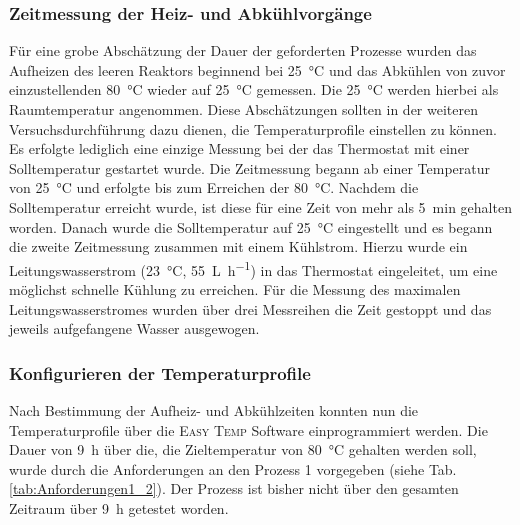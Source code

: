\subsubsection*{Zeitmessung der Heiz- und Abkühlvorgänge}
Für eine grobe Abschätzung der Dauer der geforderten Prozesse wurden das Aufheizen des leeren Reaktors beginnend bei \SI{25}{\celsius} und das Abkühlen von zuvor einzustellenden \SI{80}{\celsius} wieder auf \SI{25}{\celsius} gemessen. Die \SI{25}{\celsius} werden hierbei als Raumtemperatur angenommen. Diese Abschätzungen sollten in der weiteren Versuchsdurchführung dazu dienen, die Temperaturprofile einstellen zu können.\\
Es erfolgte lediglich eine einzige Messung bei der das Thermostat mit einer Solltemperatur gestartet wurde. Die Zeitmessung begann ab einer Temperatur von \SI{25}{\celsius} und erfolgte bis zum Erreichen der \SI{80}{\celsius}. Nachdem die Solltemperatur erreicht wurde, ist diese für eine Zeit von mehr als \SI{5}{\minute} gehalten worden. Danach wurde die Solltemperatur auf \SI{25}{\celsius} eingestellt und es begann die zweite Zeitmessung zusammen mit einem Kühlstrom. Hierzu wurde ein Leitungswasserstrom (\SI{23}{\celsius}, \SI{55}{\liter\per \hour}) in das Thermostat eingeleitet, um eine möglichst schnelle Kühlung zu erreichen. Für die Messung des maximalen Leitungswasserstromes wurden über drei Messreihen die Zeit gestoppt und das jeweils aufgefangene Wasser ausgewogen.
\vspace*{-3mm}
\subsubsection*{Konfigurieren der Temperaturprofile}
Nach Bestimmung der Aufheiz- und Abkühlzeiten konnten nun die Temperaturprofile über die \textsc{Easy Temp} Software einprogrammiert werden. Die Dauer von \SI{9}{\hour} über die, die Zieltemperatur von \SI{80}{\celsius} gehalten werden soll, wurde durch die  Anforderungen an den Prozess 1 vorgegeben (siehe Tab. \ref{tab:Anforderungen1_2}). Der Prozess ist bisher nicht über den gesamten Zeitraum über \SI{9}{\hour} getestet worden.

%
\vspace*{-3mm}
